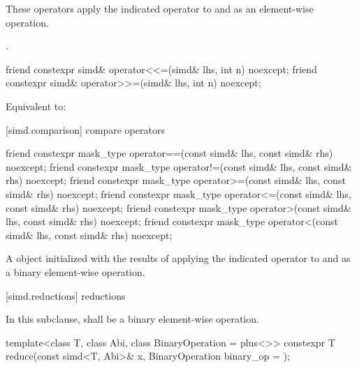 \begin{itemdescr}
  \pnum\ConstraintOperatorTWellFormed

  \pnum\effects
  These operators apply the indicated operator to  and  as an element-wise operation.

  \pnum\returns
  .
\end{itemdescr}

\begin{itemdecl}
friend constexpr simd& operator<<=(simd& lhs, int n) noexcept;
friend constexpr simd& operator>>=(simd& lhs, int n) noexcept;
\end{itemdecl}

\begin{itemdescr}
  \pnum\ConstraintOperatorTWellFormed

  \pnum\effects
  Equivalent to: 
\end{itemdescr}

[simd.comparison]{ compare operators}

\begin{itemdecl}
friend constexpr mask_type operator==(const simd& lhs, const simd& rhs) noexcept;
friend constexpr mask_type operator!=(const simd& lhs, const simd& rhs) noexcept;
friend constexpr mask_type operator>=(const simd& lhs, const simd& rhs) noexcept;
friend constexpr mask_type operator<=(const simd& lhs, const simd& rhs) noexcept;
friend constexpr mask_type operator>(const simd& lhs, const simd& rhs) noexcept;
friend constexpr mask_type operator<(const simd& lhs, const simd& rhs) noexcept;
\end{itemdecl}

\begin{itemdescr}
  \pnum\ConstraintOperatorTWellFormed

  \pnum\returns
  A  object initialized with the results of applying the indicated operator to  and  as a binary element-wise operation.
\end{itemdescr}

[simd.reductions]{\texorpdfstring{ r}{simd r}eductions}

\pnum
In this subclause,  shall be a binary element-wise operation.

\begin{itemdecl}
template<class T, class Abi, class BinaryOperation = plus<>>
  constexpr T reduce(const simd<T, Abi>& x, BinaryOperation binary_op = {});
\end{itemdecl}

